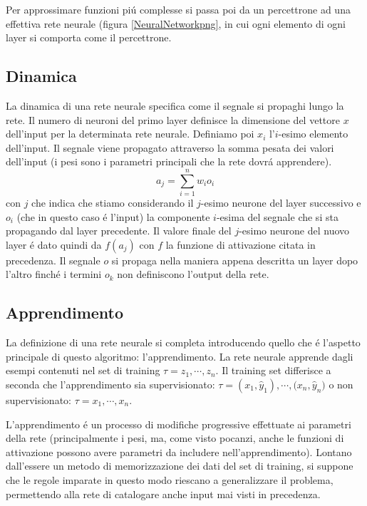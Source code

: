 \documentclass[a4paper,10pt]{article}
\begin{document}
 Per approssimare funzioni pi\'u complesse si passa poi da un percettrone ad una effettiva rete neurale (figura \ref{NeuralNetworkpng}, in cui ogni elemento di ogni layer si comporta come il percettrone.

 
 \subsection{Dinamica}
 
 La dinamica di una rete neurale specifica come il segnale si propaghi lungo la rete. Il numero di neuroni del primo layer definisce la dimensione del vettore $x$ dell'input per la determinata rete neurale. Definiamo poi $x_i$ l'$i$-esimo elemento dell'input. 
 Il segnale viene propagato attraverso la somma pesata dei valori dell'input (i pesi sono i parametri principali che la rete dovr\'a apprendere).
 \begin{equation}
  a_j = \sum_{i=1}^n w_i o_i
 \end{equation}
con $j$ che indica che stiamo considerando il $j$-esimo neurone del layer successivo e $o_i$ (che in questo caso \'e l'input) la componente $i$-esima del segnale che si sta propagando dal layer precedente. Il valore finale del $j$-esimo neurone del nuovo layer \'e dato quindi da $f(a_j)$ con $f$ la funzione di attivazione citata in precedenza. Il segnale $o$ si propaga nella maniera appena descritta un layer dopo l'altro finch\'e i termini $o_k$ non definiscono l'output della rete.
 
 \subsection{Apprendimento}
 
 La definizione di una rete neurale si completa introducendo quello che \'e l'aspetto principale di questo algoritmo: l'apprendimento. 
 La rete neurale apprende dagli esempi contenuti nel set di training $\tau = {z_1,\cdots,z_n}$. Il training set differisce a seconda che l'apprendimento sia supervisionato: $\tau = {(x_1,\hat{y}_1),\cdots, (x_n,\hat{y}_n})$ o non supervisionato: $\tau = {x_1,\cdots,x_n}$.
 
 L'apprendimento \'e un processo di modifiche progressive effettuate ai parametri della rete (principalmente i pesi, ma, come visto pocanzi, anche le funzioni di attivazione possono avere parametri da includere nell'apprendimento). Lontano dall'essere un metodo di memorizzazione dei dati del set di training, si suppone che le regole imparate in questo modo riescano a generalizzare il problema, permettendo alla rete di catalogare anche input mai visti in precedenza.
 
\end{document}
